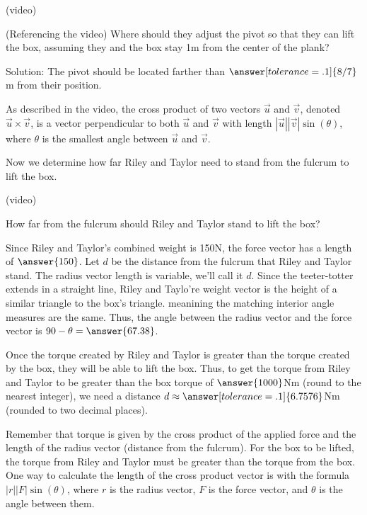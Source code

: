 \documentclass{ximera}
\begin{document}
(video)

\begin{problem}
    (Referencing the video) Where should they adjust the pivot so that they can lift the box, assuming they and the box stay 1m from the center of the plank?

    Solution: The pivot should be located farther than $\answer[tolerance=.1]{8/7}$ m from their position.
\end{problem}

\begin{definition}
    As described in the video, the cross product of two vectors $\vec{u}$ and $\vec{v}$, denoted $\vec{u}\times \vec{v}$, is a vector perpendicular to both $\vec{u}$ and $\vec{v}$ with length $|\vec{u}||\vec{v}|\sin(\theta)$, where $\theta$ is the smallest angle between $\vec{u}$ and $\vec{v}$.
\end{definition}



Now we determine how far Riley and Taylor need to stand from the fulcrum to lift the box.

(video)

\begin{problem}
    How far from the fulcrum should Riley and Taylor stand to lift the box?

    Since Riley and Taylor's combined weight is 150N, the force vector has a length of $\answer{150}$. Let $d$ be the distance from the fulcrum that Riley and Taylor stand. The radius vector length is variable, we'll call it $d$. Since the teeter-totter extends in a straight line, Riley and Taylo're weight vector is the height of a similar triangle to the box's triangle. meanining the matching interior angle measures are the same. Thus, the angle between the radius vector and the force vector is $90-\theta=\answer{67.38}$.

    Once the torque created by Riley and Taylor is greater than the torque created by the box, they will be able to lift the box. Thus, to get the torque from Riley and Taylor to be greater than the box torque of $\answer{1000}$Nm (round to the nearest integer), we need a distance $d\approx\answer[tolerance=.1]{6.7576}$Nm (rounded to two decimal places).
    \begin{feedback}
        Remember that torque is given by the cross product of the applied force and the length of the radius vector (distance from the fulcrum). For the box to be lifted, the torque from Riley and Taylor must be greater than the torque from the box. One way to calculate the length of the cross product vector is with the formula $|r||F|\sin(\theta)$, where $r$ is the radius vector, $F$ is the force vector, and $\theta$ is the angle between them.
    \end{feedback}
\end{problem}
\end{document}
